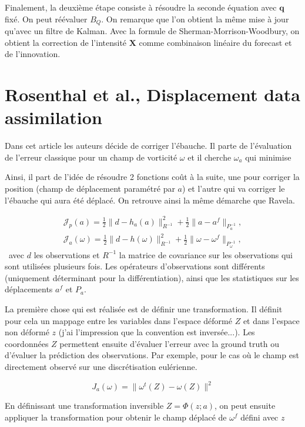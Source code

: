 \documentclass{article}
\newcommand{\norm}[1]{\|#1\|}
\begin{document}
Finalement, la deuxième étape consiste à résoudre la seconde équation avec $\mathbf{q}$ fixé. On peut réévaluer $B_Q$. On remarque que l'on obtient la même mise à jour qu'avec un filtre de Kalman. Avec la formule de Sherman-Morrison-Woodbury, on obtient la correction de l'intensité $\mathbf{X}$ comme combinaison linéaire du forecast et de l'innovation.

\section{Rosenthal et al., Displacement data assimilation}
Dans cet article les auteurs décide de corriger l'ébauche. Il parte de l'évaluation de l'erreur classique pour un champ de vorticité $\omega$ et il cherche $\omega_a$ qui minimise

Ainsi, il part de l'idée de résoudre 2 fonctions coût à la suite, une pour corriger la position (champ de déplacement paramétré par $a$) et l'autre qui va corriger le l'ébauche qui aura été déplacé. On retrouve ainsi la même démarche que Ravela.

\begin{eqnarray*}
    \mathcal J_p(a) = \frac12 \norm{d - h_a(a)}^2_{R^{-1}} + \frac12 \norm{a - a^f}_{P^{-1}_{a}}, \\
    \mathcal J_a(\omega) = \frac12 \norm{d - h(\omega)}^2_{R^{-1}} + \frac12 \norm{\omega - \omega^f}_{P^{-1}_{\omega}},
\end{eqnarray*}~avec $d$ les observations et $R^{-1}$ la matrice de covariance sur les observations qui sont utilisées plusieurs fois. Les opérateurs d'observations sont différents (uniquement déterminant pour la différentiation), ainsi que les statistiques sur les déplacements $a^f$ et $P_{a}$.

La première chose qui est réalisée est de définir une transformation. Il définit pour cela un mappage entre les variables dans l'espace déformé $Z$ et dans l'espace non déformé $z$ (j'ai l'impression que la convention est inversée...). Les coordonnées $Z$ permettent ensuite d'évaluer l'erreur avec la ground truth ou d'évaluer la prédiction des observations. Par exemple, pour le cas où le champ est directement observé sur une discrétisation eulérienne.

$$
    J_a(\omega) = \norm{\omega^t(Z) - \omega(Z)}^2
$$

En définissant une transformation inversible $Z = \Phi(z; a)$, on peut ensuite appliquer la transformation pour obtenir le champ déplacé de $\omega^f$ défini avec $z$
\end{document}
